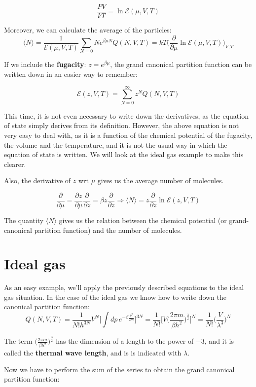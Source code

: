 	$$\frac{PV}{kT} = \ln\mathcal{E}(\mu, V, T)$$

Moreover, we can calculate the average of the particles:
	$$\langle N\rangle = \frac{1}{\mathcal{E}(\mu, V, T)}\sum\limits_{N=0}Ne^{\beta\mu N}Q(N, V, T) = kT\biggl(\frac{\partial}{\partial\mu}\ln\mathcal{E}(\mu, V, T)\biggr)_{V, T}$$
	
	If we include the \textbf{fugacity}: $z = e^{\beta\mu}$, the grand canonical partition function can be written down in an easier way to remember:

	$$\mathcal{E}(z, V, T) = \sum\limits_{N=0}^{\infty}z^NQ(N, V, T)$$
	
	This time, it is not even necessary to write down the derivatives, as the equation of state simply derives from its definition.
	However, the above equation is not very easy to deal with, as it is a function of the chemical potential of the fugacity, the volume and the temperature, and it is not the usual way in which the equation of state is written. 
	We will look at the ideal gas example to make this clearer. 
	
	Also, the derivative of $z$ wrt $\mu$ gives us the average number of molecules.

	$$\frac{\partial}{\partial\mu} = \frac{\partial z}{\partial\mu}\frac{\partial}{\partial z} = \beta z\frac{\partial}{\partial z}\Rightarrow\langle N\rangle = z\frac{\partial}{\partial z}\ln\mathcal{E}(z, V, T)$$
	
	The quantity $\langle N\rangle$ gives us the relation between the chemical potential (or grand-canonical partition function) and the number of molecules. 
	 
\section{Ideal gas}
As an easy example, we'll apply the previously described equations to the ideal gas situation.
In the case of the ideal gas we know how to write down the canonical partition function: 
$$Q(N, V, T) = \frac{1}{N!h^{3N}}V^N\biggl[\int dp \, e^{-\beta\frac{p^2}{2m}}\biggr]^{3N} = \frac{1}{N!}\biggl[V\biggl(\frac{2\pi m}{\beta h^2}\biggr)^{\frac{3}{2}}\biggr]^{N} = \frac{1}{N!}\biggl(\frac{V}{\lambda^3}\biggr)^N$$

The term $(\frac{2\pi m}{\beta h^2}\biggr)^{\frac{3}{2}}$ has the dimension of a length to the power of $-3$, and it is called the \textbf{thermal wave length}, and is is indicated with $\lambda$.

Now we have to perform the sum of the series to obtain the grand canonical partition function:

